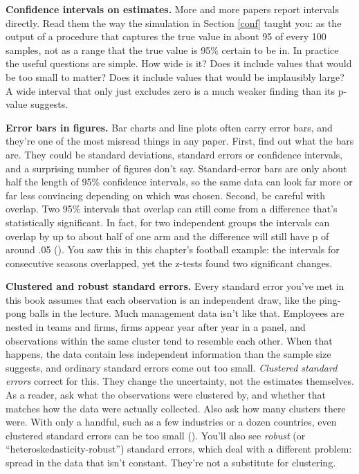 \documentclass[
]{book}
\begin{document}
\textbf{Confidence intervals on estimates.} More and more papers report intervals directly. Read them the way the simulation in Section \ref{conf} taught you: as the output of a procedure that captures the true value in about 95 of every 100 samples, not as a range that the true value is 95\% certain to be in. In practice the useful questions are simple. How wide is it? Does it include values that would be too small to matter? Does it include values that would be implausibly large? A wide interval that only just excludes zero is a much weaker finding than its p-value suggests.

\textbf{Error bars in figures.} Bar charts and line plots often carry error bars, and they're one of the most misread things in any paper. First, find out what the bars are. They could be standard deviations, standard errors or confidence intervals, and a surprising number of figures don't say. Standard-error bars are only about half the length of 95\% confidence intervals, so the same data can look far more or far less convincing depending on which was chosen. Second, be careful with overlap. Two 95\% intervals that overlap can still come from a difference that's statistically significant. In fact, for two independent groups the intervals can overlap by up to about half of one arm and the difference will still have p of around .05 (). You saw this in this chapter's football example: the intervals for consecutive seasons overlapped, yet the z-tests found two significant changes.

\textbf{Clustered and robust standard errors.} Every standard error you've met in this book assumes that each observation is an independent draw, like the ping-pong balls in the lecture. Much management data isn't like that. Employees are nested in teams and firms, firms appear year after year in a panel, and observations within the same cluster tend to resemble each other. When that happens, the data contain less independent information than the sample size suggests, and ordinary standard errors come out too small. \emph{Clustered standard errors} correct for this. They change the uncertainty, not the estimates themselves. As a reader, ask what the observations were clustered by, and whether that matches how the data were actually collected. Also ask how many clusters there were. With only a handful, such as a few industries or a dozen countries, even clustered standard errors can be too small (). You'll also see \emph{robust} (or ``heteroskedasticity-robust'') standard errors, which deal with a different problem: spread in the data that isn't constant. They're not a substitute for clustering.
\end{document}
